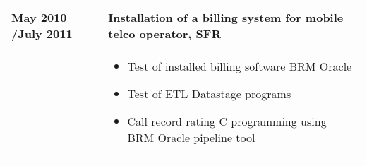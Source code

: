 \documentclass[a4paper,11pt]{letter}
\begin{document}
\begin{tabular}{|p{}|p{}|}
May 2010 \slash July 2011 & Installation of a billing system for mobile telco operator, SFR \\
	
\hline

& \begin{itemize}
\item Test of installed billing software BRM Oracle
\item Test of ETL Datastage programs
\item Call record rating C programming using BRM Oracle pipeline tool
\end{itemize} \\
	
\hline

%	
%
%	
%
%
%	
%
%	
%
%	
%
%
%
%
%	
%
%	
%
%	
%
%
%	
%
%	
%
%	
%
%
%

\end{tabular}
\end{document}
